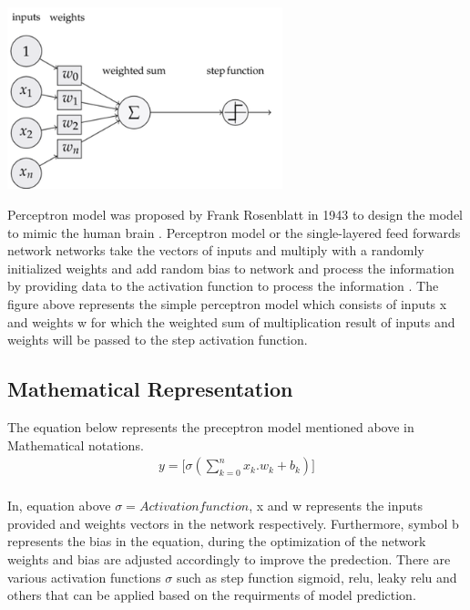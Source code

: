 
\begin{center}
    \includegraphics[width=0.6\textwidth]{Images/p_model.png} \\
\end{center}
\vspace{2mm}
Perceptron model was proposed by Frank Rosenblatt in 1943 to design the model to 
mimic the human brain \citep{939589}. Perceptron model or the single-layered feed forwards network 
networks take the vectors of inputs and multiply with a randomly 
initialized weights and add random bias to network and process the information by providing data to the
activation function to process the information \citep{AGATONOVICKUSTRIN2000717}.
The figure above represents the simple perceptron model which consists of inputs x and weights w 
for which the weighted sum of multiplication result of 
inputs and weights will be passed to the step activation function.

\subsection{Mathematical Representation }
\vspace{3mm}
{The equation below represents the preceptron model mentioned above in Mathematical notations.}
\begin{equation}
    \begin{split}
        y = \Big[\sigma(\sum_{k=0}^n x_k.w_k + b_k)\Big] \\
    \end{split}
\end{equation}

     {
        In, equation above ${\sigma = Activation function}$, x and w represents the inputs provided 
        and weights vectors in the network respectively. Furthermore, symbol b represents the bias in the equation, 
        during the optimization of the network weights and bias are adjusted accordingly to improve the 
        predection. There are various activation functions ${\sigma}$ such as  step function sigmoid, 
        relu, leaky relu and others that can be applied based on the requirments of model prediction.
    }